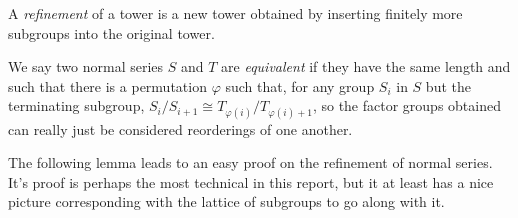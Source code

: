A \emph{refinement} of a tower is a new tower obtained by inserting finitely more subgroups into the original tower.

We say two normal series $S$ and $T$ are \emph{equivalent}  if they have the same length and such that there is a permutation $\varphi$ such that, for any group $S_i$ in $S$ but the terminating subgroup, $S_i/S_{i+1} \cong T_{\varphi(i)}/T_{\varphi(i) + 1}$, so the factor groups obtained can really just be considered reorderings of one another.

The following lemma leads to an easy proof on the refinement of normal series. It's proof is perhaps the most technical in this report, but it at least has a nice picture corresponding with the lattice of subgroups to go along with it.%

%

